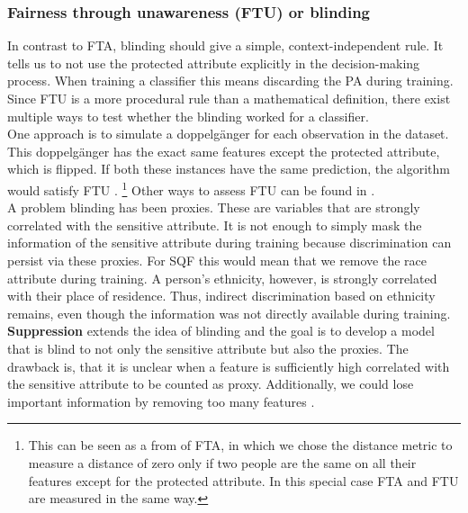 \subsubsection*{Fairness through unawareness (FTU) or blinding}
In contrast to FTA, blinding should give a simple, context-independent rule. It tells us to not use the protected attribute explicitly in the decision-making process. When training a classifier this means discarding the PA during training.
Since FTU is a more procedural rule than a mathematical definition, there exist multiple ways to test whether the blinding worked for a classifier. \\
One approach is to simulate a doppelgänger for each observation in the dataset. This doppelgänger has the exact same features except the protected attribute, which is flipped.
If both these instances have the same prediction, the algorithm would satisfy FTU \cite{verma2018}. \footnote{This can be seen as a from of FTA, in which we chose the distance metric to measure a distance of zero only if two people are the same on all their features except for the protected attribute. In this special case FTA and FTU are measured in the same way.} Other ways to assess FTU can be found in \cite{verma2018}.\\
A problem blinding has been proxies. These are variables that are strongly correlated with the sensitive attribute. It is not enough to simply mask the information of the sensitive attribute during training because discrimination can persist via these proxies.
For SQF this would mean that we remove the race attribute during training.
A person's ethnicity, however, is strongly correlated with their place of residence. Thus, indirect discrimination based on ethnicity remains, even though the information was not directly available during training.\\
\textbf{Suppression} extends the idea of blinding and the goal is to develop a model that is blind to not only the sensitive attribute but also the proxies. The drawback is, that it is unclear when a feature is sufficiently high correlated with the sensitive attribute to be counted as proxy. Additionally, we could lose important information by removing too many features \cite{castelnovo2022}.


